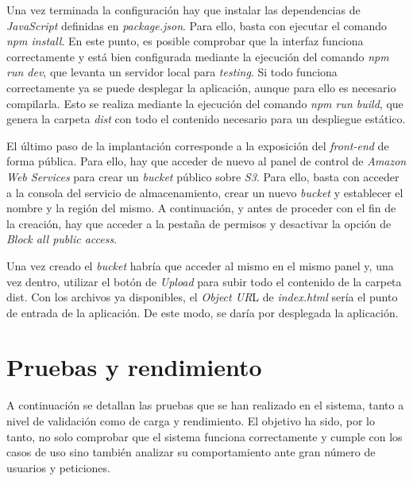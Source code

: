 \documentclass[11pt,spanish,listoffigures]{tfgetsinf}
\begin{document}
Una vez terminada la configuración hay que instalar las dependencias de \textit{JavaScript} definidas en \textit{package.json}. Para ello, basta con ejecutar el comando \textit{npm install}. En este punto, es posible comprobar que la interfaz funciona correctamente y está bien configurada mediante la ejecución del comando \textit{npm run dev}, que levanta un servidor local para \textit{testing}. Si todo funciona correctamente ya se puede desplegar la aplicación, aunque para ello es necesario compilarla. Esto se realiza mediante la ejecución del comando \textit{npm run build}, que genera la carpeta \textit{dist} con todo el contenido necesario para un despliegue estático.

El último paso de la implantación corresponde a la exposición del \textit{front-end} de forma pública. Para ello, hay que acceder de nuevo al panel de control de \textit{Amazon Web Services} para crear un \textit{bucket} público sobre \textit{S3}. Para ello, basta con acceder a la consola del servicio de almacenamiento, crear un nuevo \textit{bucket} y establecer el nombre y la región del mismo. A continuación, y antes de proceder con el fin de la creación, hay que acceder a la pestaña de permisos y desactivar la opción de \textit{Block all public access}.

Una vez creado el \textit{bucket} habría que acceder al mismo en el mismo panel y, una vez dentro, utilizar el botón de \textit{Upload} para subir todo el contenido de la carpeta dist. Con los archivos ya disponibles, el \textit{Object UR}L de \textit{index.html} sería el punto de entrada de la aplicación. De este modo, se daría por desplegada la aplicación.



\chapter{Pruebas y rendimiento}
\label{ch:pruebas}

A continuación se detallan las pruebas que se han realizado en el sistema, tanto a nivel de validación como de carga y rendimiento. El objetivo ha sido, por lo tanto, no solo comprobar que el sistema funciona correctamente y cumple con los casos de uso sino también analizar su comportamiento ante gran número de usuarios y peticiones.
\end{document}

